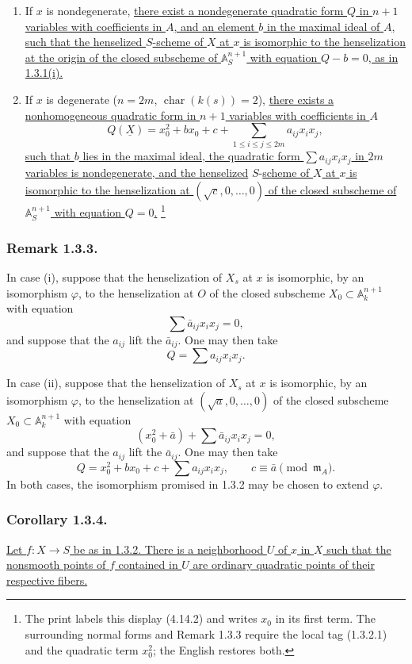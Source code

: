 \begin{enumerate}[label=(\roman*),leftmargin=2.6em]
\item If $x$ is nondegenerate, \underline{there exist a
nondegenerate quadratic form $Q$ in $n+1$ variables with
coefficients in $A$, and an element $b$ in the maximal ideal of $A$,
such that the henselized $S$-scheme of $X$ at $x$ is isomorphic to
the henselization at the origin of the closed subscheme of
$\mathbb A_S^{n+1}$ with equation $Q-b=0$, as in 1.3.1(i).}

\item If $x$ is degenerate
($n=2m$, $\operatorname{char}(k(s))=2$), \underline{there exists a
nonhomogeneous quadratic form in $n+1$ variables with coefficients
in $A$}
\begin{equation}\tag{1.3.2.1}
Q(\underline X)=x_0^2+b x_0+c+
 \sum_{1\leq i\leq j\leq 2m}a_{ij}x_i x_j,
\end{equation}
\underline{such that $b$ lies in the maximal ideal, the quadratic
form $\sum a_{ij}x_i x_j$ in $2m$ variables is nondegenerate, and
the henselized} $S$-\underline{scheme of $X$ at $x$ is isomorphic to the
henselization at $(\sqrt c,0,\ldots,0)$ of the closed subscheme of
$\mathbb A_S^{n+1}$ with equation $Q=0$.}
\footnote{The print labels this display (4.14.2) and writes $x_0$ in
its first term.  The surrounding normal forms and Remark 1.3.3
require the local tag (1.3.2.1) and the quadratic term $x_0^2$; the
English restores both.}
\end{enumerate}

\subsubsection*{Remark 1.3.3.}
In case (i), suppose that the henselization of $X_s$ at $x$ is
isomorphic, by an isomorphism $\varphi$, to the henselization at $O$
of the closed subscheme
$X_0\subset\mathbb A_k^{n+1}$ with equation
\[
\sum\bar a_{ij}x_i x_j=0,
\]
and suppose that the $a_{ij}$ lift the $\bar a_{ij}$.  One may then
take
\[
Q=\sum a_{ij}x_i x_j.
\]

In case (ii), suppose that the henselization of $X_s$ at $x$ is
isomorphic, by an isomorphism $\varphi$, to the henselization at
$(\sqrt a,0,\ldots,0)$ of the closed subscheme
$X_0\subset\mathbb A_k^{n+1}$ with equation
\[
(x_0^2+\bar a)+\sum\bar a_{ij}x_i x_j=0,
\]
and suppose that the $a_{ij}$ lift the $\bar a_{ij}$.  One may then
take
\[
Q=x_0^2+b x_0+c+\sum a_{ij}x_i x_j,
\qquad c\equiv\bar a\pmod{\mathfrak m_A}.
\]
In both cases, the isomorphism promised in 1.3.2 may be chosen to
extend $\varphi$.

\subsubsection*{Corollary 1.3.4.}
\underline{Let $f:X\to S$ be as in 1.3.2.  There is a neighborhood
$U$ of $x$ in $X$ such that the nonsmooth points of $f$ contained in
$U$ are ordinary quadratic points of their respective fibers.}
